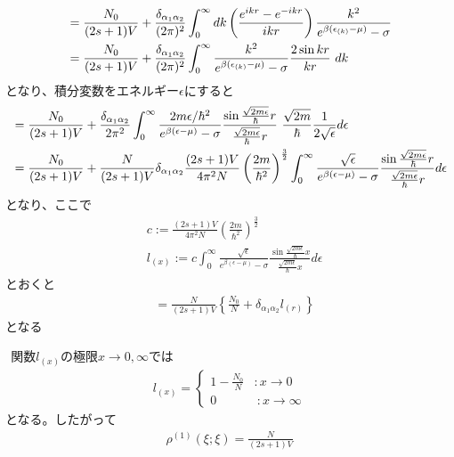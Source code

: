 \documentclass[dvipdfmx, 11pt, a4paper]{jsarticle}
\numberwithin{equation}{section}
\theoremstyle{definition}
\begin{document}
\begin{derivationBox}
\begin{align}
            &= \frac{N_0}{(2s+1)V} +  \frac{\delta_{\alpha_1 \alpha_2}}{(2\pi)^2} \int_0^\infty dk \left( \frac{e^{ikr}-e^{-ikr}}{ikr}  \right) \frac{k^2}{e^{\beta (\epsilon_{(k)} -\mu)}-\sigma} \notag \\
            &= \frac{N_0}{(2s+1)V} +  \frac{\delta_{\alpha_1 \alpha_2}}{(2\pi)^2} \int_0^\infty \frac{k^2}{e^{\beta (\epsilon_{(k)} -\mu)}-\sigma} \frac{2\sin kr}{kr}\ dk
        \end{align}
        となり、積分変数をエネルギー$\epsilon$にすると
        \begin{align}
            &= \frac{N_0}{(2s+1)V} +  \frac{\delta_{\alpha_1 \alpha_2}}{2\pi^2} \int_0^\infty \frac{2m\epsilon / \hbar^2}{e^{\beta (\epsilon -\mu)}-\sigma} \frac{\sin \frac{\sqrt{2m\epsilon}}{\hbar}r}{\frac{\sqrt{2m\epsilon}}{\hbar}r}\ \frac{\sqrt{2m}}{\hbar} \frac{1}{2\sqrt{\epsilon}}d\epsilon \notag \\
            &= \frac{N_0}{(2s+1)V} + \frac{N}{(2s+1)V} \delta_{\alpha_1 \alpha_2}\frac{(2s+1)V}{4\pi^2N} \left( \frac{2m}{\hbar^2} \right)^{\frac{3}{2}} \int_0^\infty \frac{\sqrt{\epsilon}}{e^{\beta (\epsilon -\mu)}-\sigma} \frac{\sin \frac{\sqrt{2m\epsilon}}{\hbar}r}{\frac{\sqrt{2m\epsilon}}{\hbar}r}d\epsilon 
        \end{align}
        となり、ここで
        \begin{align}
            &c := \frac{(2s+1)V}{4\pi^2N} \left( \frac{2m}{\hbar^2} \right)^{\frac{3}{2}} \\
            &l_{(x)} := c\int_0^\infty \frac{\sqrt{\epsilon}}{e^{\beta (\epsilon -\mu)}-\sigma} \frac{\sin \frac{\sqrt{2m\epsilon}}{\hbar}x}{\frac{\sqrt{2m\epsilon}}{\hbar}x}d\epsilon
        \end{align}
        とおくと
        \begin{align}
            &= \frac{N}{(2s+1)V} \left\{ \frac{N_0}{N} + \delta_{\alpha_1 \alpha_2} l_{(r)} \right\}
        \end{align}
        となる
    \end{derivationBox}
    $\ \ $関数$l_{(x)}$の極限$x\rightarrow 0,\infty$では
    \begin{align}
        l_{(x)} = 
        \left\{
        \begin{matrix}
            1-\frac{N_0}{N}&:x\rightarrow0\\
            0&\ :x\rightarrow\infty
        \end{matrix}
        \right.
    \end{align}
    となる。したがって
    \begin{align}
        \rho^{(1)}(\xi;\xi) = \frac{N}{(2s+1)V}
    \end{align}
\end{document}
